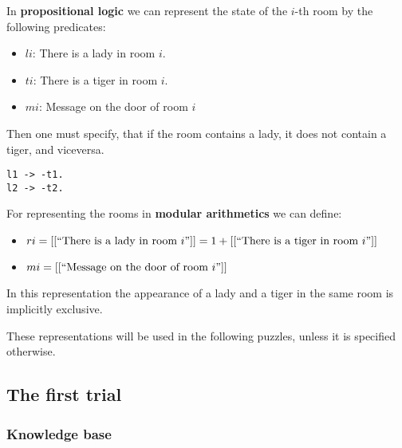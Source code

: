 In \textbf{propositional logic} we can represent the state of the $i$-th room by the following predicates:

\begin{itemize}

\item $li$: There is a lady in room $i$.
\item $ti$: There is a tiger in room $i$.
\item $mi$: Message on the door of room $i$
 
\end{itemize}

Then one must specify, that if the room contains a lady, it does not contain a tiger, and viceversa.

\begin{lstlisting}[numbers=none]
l1 -> -t1.
l2 -> -t2.
\end{lstlisting}


For representing the rooms in \textbf{modular arithmetics} we can define:

\begin{itemize}

\item 
\begin{math}
ri = [[``\textrm{There is a lady in room } i"]] = 1 +  [[``\textrm{There is a tiger in room } i"]] 
\end{math}


\item 
\begin{math}
mi = [[``\textrm{Message on the door of room } i"]]
\end{math}
 
\end{itemize}

In this representation the appearance of a lady and a tiger in the same room is implicitly exclusive.

These representations will be used in the following puzzles, unless it is specified otherwise.









\subsection{The first trial}

\subsubsection{Knowledge base}

